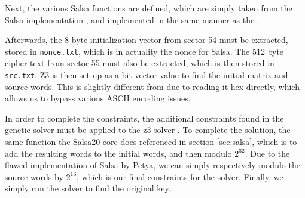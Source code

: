 \documentclass[twocolumn]{article}
\newcommand{\code}[1]{\texttt{#1}}
\begin{document}
Next, the various Salsa functions are defined, which are simply taken from the Salsa implementation \cite{salsa20}, and implemented in the same manner as the \cite{codeTemplate}.

Afterwards, the 8 byte initialization vector from sector 54 must be extracted, stored in \code{nonce.txt}, which is in actuality the nonce for Salsa. The 512 byte cipher-text from sector 55 must also be extracted, which is then stored in \code{src.txt}. Z3 is then set up as a bit vector value to find the initial matrix and source words. This is slightly different from \cite{codeTemplate} due to reading it hex directly, which allows us to bypass various ASCII encoding issues.

In order to complete the constraints, the additional constraints found in the genetic solver must be applied to the z3 solver \cite{geneticSolver}. To complete the solution, the same function the Salsa20 core does referenced in section \ref{sec:salsa}, which is to add the resulting words to the initial words, and then modulo $2^{32}$. Due to the flawed implementation of Salsa by Petya, we can simply respectively modulo the source words by $2^{16}$, which is our final constraints for the solver. Finally, we simply run the solver to find the original key. 

 
\end{document}
